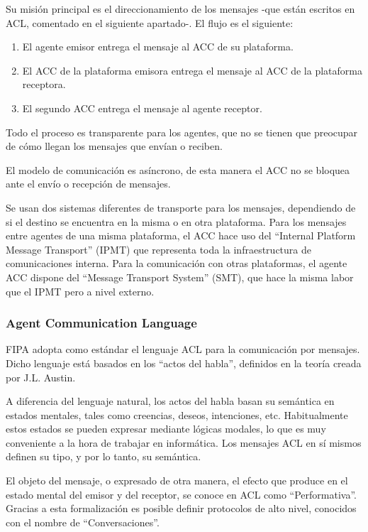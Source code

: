Su misión principal es el direccionamiento de los mensajes -que están escritos
en ACL, comentado en el siguiente apartado-. El flujo es el siguiente:

\begin{enumerate}
 \item El agente emisor entrega el mensaje al ACC de su plataforma.
 \item El ACC de la plataforma emisora entrega el mensaje al ACC de la
 plataforma receptora.
 \item El segundo ACC entrega el mensaje al agente receptor.
\end{enumerate}

Todo el proceso es transparente para los agentes, que no se tienen que
preocupar de cómo llegan los mensajes que envían o reciben.

El modelo de comunicación es asíncrono, de esta manera el ACC no se bloquea
ante el envío o recepción de mensajes.

Se usan dos sistemas diferentes de transporte para los mensajes, dependiendo de
si el destino se encuentra en la misma o en otra plataforma. Para los mensajes
entre agentes de una misma plataforma, el ACC hace uso del ``Internal Platform
Message Transport'' (IPMT) que representa toda la infraestructura de
comunicaciones interna. Para la comunicación con otras plataformas, el agente
ACC dispone del ``Message Transport System'' (SMT), que hace la misma labor que
el IPMT pero a nivel externo.

\subsubsection{Agent Communication Language}

FIPA adopta como estándar el lenguaje ACL para la comunicación por mensajes.
Dicho lenguaje está basados en los ``actos del habla'', definidos en la teoría
creada por J.L. Austin\cite{Austin62}.

A diferencia del lenguaje natural, los actos del habla basan su semántica en
estados mentales, tales como creencias, deseos, intenciones, etc. Habitualmente
estos estados se pueden expresar mediante lógicas modales, lo que es muy
conveniente a la hora de trabajar en informática. Los mensajes ACL en sí mismos
definen su tipo, y por lo tanto, su semántica.

El objeto del mensaje, o expresado de otra manera, el efecto que produce en el
estado mental del emisor y del receptor, se conoce en ACL como
``Performativa''. Gracias a esta formalización es posible definir protocolos de
alto nivel, conocidos con el nombre de ``Conversaciones''.

